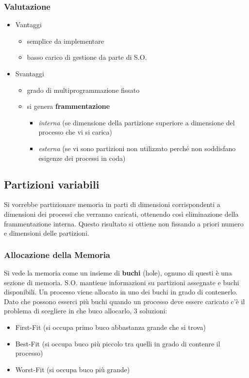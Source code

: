 \documentclass{article}
\begin{document}
\subsubsection{Valutazione}
\begin{itemize}
    \item Vantaggi
        \begin{itemize}
            \item semplice da implementare
            \item basso carico di gestione da parte di S.O.
        \end{itemize}
    \item Svantaggi
        \begin{itemize}
            \item grado di multiprogrammazione fissato
            \item si genera \textbf{frammentazione}
                \begin{itemize}
                    \item \textit{interna} (se dimensione della partizione superiore a dimensione del processo che vi si carica)
                    \item \textit{esterna} (se vi sono partizioni non utilizzato perché non soddisfano esigenze dei processi in coda)
                \end{itemize}
        \end{itemize}
\end{itemize}
\subsection{Partizioni variabili}
Si vorrebbe partizionare memoria in parti di dimensioni corrispondenti a dimensioni dei processi che verranno caricati, ottenendo così eliminazione della frammentazione interna. Questo risultato si ottiene non fissando a priori numero e dimensioni delle partizioni.
\subsubsection{Allocazione della Memoria}
Si vede la memoria come un insieme di \textbf{buchi} (hole), ognuno di questi è una sezione di memoria. S.O. mantiene informazioni su partizioni assegnate e buchi disponibili. Un processo viene allocato in uno dei buchi in grado di contenerlo. \\
Dato che possono esserci più buchi quando un processo deve essere caricato c'è il problema di scegliere in che buco allocarlo, 3 soluzioni:
\begin{itemize}
    \item First-Fit (si occupa primo buco abbastanza grande che si trova)
    \item Best-Fit (si occupa buco più piccolo tra quelli in grado di contenre il processo)
    \item Worst-Fit (si occupa buco più grande)
\end{itemize}
\end{document}
